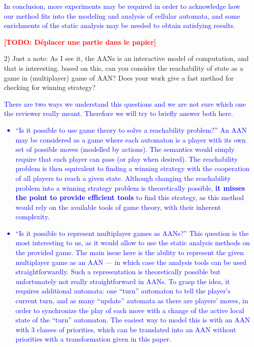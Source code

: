 \documentclass[11pt]{article}
\newcommand{\todo}[1]{\textcolor{red}{\textbf{[TODO: #1]}}}
\newcommand{\ilanswer}[1]{\textcolor{blue}{#1}}
\newcommand{\answer}[1]{\ilanswer{#1}\vspace*{1em}}
\begin{document}
\answer{In conclusion,
more experiments may be required in order to acknowledge how our method fits into the modeling and analysis of cellular automata,
and some enrichments of the static analysis may be needed to obtain satisfying results.
}

\todo{Déplacer une partie dans le papier}



2) Just a note: As I see it, the AANs is an interactive model of computation, and that is interesting. based on this, can you consider the reachability of state as a game in (multiplayer) game of AAN? Does  your work give a fast method for checking for winning strategy?   

\ilanswer{There are two ways we understand this questions and we are not sure which one the reviewer really meant. Therefore we will try to briefly answer both here.
\begin{itemize}
  \item “Is it possible to use game theory to solve a reachability problem?”
    An AAN may be considered as a game where each automaton is a player with its own set of possible moves (modelled by actions).
    The semantics would simply require that each player can pass (or play when desired).
    The reachability problem is then equivalent to finding a winning strategy with the cooperation of all players to reach a given state.
    Although changing the reachability problem into a winning strategy problem is theoretically possible,
    \textbf{it misses the point to provide efficient tools} to find this strategy,
    as this method would rely on the available tools of game theory, with their inherent complexity.
  \item “Is it possible to represent multiplayer games as AANs?”
    This question is the most interesting to us, as it would allow to use the static analysis methods on the provided game.
    The main issue here is the ability to represent the given multiplayer game as an AAN ---
    in which case the analysis tools can be used straightforwardly.
    Such a representation is theoretically possible but unfortunately not really straightforward in AANs.
    To grasp the idea, it requires additional automata: one “turn” automaton to tell the player's current turn, and as many “update” automata as there are players' moves, in order to synchronize the play of each move with a change of the active local state of the “turn” automaton.
    The easiest way to model this is with an AAN with 3 classes of priorities,
    which can be translated into an AAN without priorities with a transformation given in this paper.

\end{itemize}}
\end{document}

